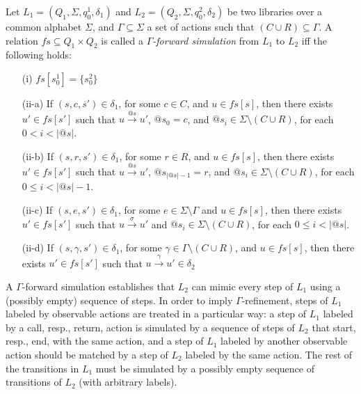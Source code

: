 \begin{dfn}
Let $L_1=(Q_1,\Sigma, q_0^1, \delta_1)$ and $L_2=(Q_2,\Sigma, q_0^2, \delta_2)$ be two libraries over a common alphabet $\Sigma$, and $\Gamma\subseteq \Sigma$ a set of actions such that $(C\cup R)\subseteq \Gamma$. A relation $\mathit{fs} \subseteq Q_{1} \times Q_{2}$ is called a \emph{$\Gamma$-forward simulation} from $L_1$ to $L_2$ iff the following holds:
\begin{itemize}
\item[(i)] $\mathit{fs}[s_0^1] = \{s_0^2 \}$
\item[(ii-a)] If $(s,c,s') \in \delta_1$, for some $c\in C$, and $u \in \mathit{fs}[s]$, then there exists $u' \in \mathit{fs}[s']$ such that $u \xrightarrow{@s} u'$, $@s_0=c$, and $@s_i\in \Sigma\setminus(C\cup R)$, for each $0<i<|@s|$.
\item[(ii-b)] If $(s,r,s') \in \delta_{1}$, for some $r\in R$, and $u \in \mathit{fs}[s]$, then there exists $u' \in \mathit{fs}[s']$ such that $u \xrightarrow{@s} u'$, $@s_{|@s| -1}=r$, and $@s_i\in \Sigma\setminus(C\cup R)$, for each $0\leq i<|@s| -1$.
\item[(ii-c)] If $(s,e,s') \in \delta_1$, for some $e \in \Sigma\setminus \Gamma$ and $u \in \mathit{fs}[s]$, then there exists $u' \in \mathit{fs}[s']$ such that $u \xrightarrow{\sigma} u'$ and $@s_i\in \Sigma\setminus(C\cup R)$, for each $0\leq i<|@s|$.
\item[(ii-d)] If $(s, \gamma , s') \in \delta_1$, for some $\gamma\in \Gamma\setminus (C\cup R)$, and $u \in fs[s]$, then there exists $u' \in fs[s']$ such that $u\xrightarrow{\gamma} u'  \in \delta_2$
\end{itemize}
\end{dfn}
A $\Gamma$-forward simulation establishes that $L_2$ can mimic every step of $L_1$ using a (possibly empty) sequence of steps. In order to imply $\Gamma$-refinement, steps of $L_1$ labeled by observable actions are treated in a particular way: a step of $L_1$ labeled by a call, resp., return, action is simulated by a sequence of steps of $L_2$ that start, resp., end, with the same action, and a step of $L_1$ labeled by another observable action should be matched by a step of $L_2$ labeled by the same action. The rest of the transitions in $L_1$ must be simulated by a possibly empty sequence of transitions of $L_2$ (with arbitrary labels).


